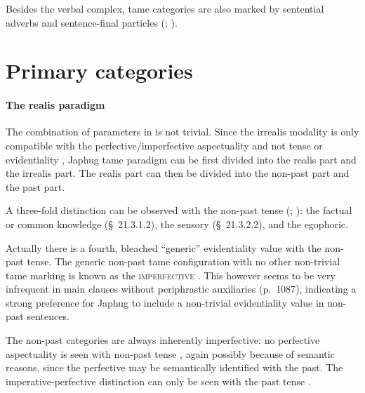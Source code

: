 \documentclass[a4paper, oneside, 12pt]{report}
\newcommand*{\citesec}[1]{\S~{#1}}
\newcommand*{\citetable}[1]{Table~{#1}}
\newcommand*{\citepage}[1]{p.~{#1}}
\newcommand*{\citepages}[1]{pp.~{#1}}
\newcommand{\category}[1]{\textsc{#1}}
\begin{document}
Besides the verbal complex, \acs{tame} categories are also marked by 
sentential adverbs and sentence-final particles 
(\citealt[\citepage{518}]{jacques2019egophoric}; \citealt[\citesec{21.8}]{jacques2021grammar}).


\section{Primary categories}
\label{sec:tame.primay}

\paragraph*{The realis paradigm}
The combination of parameters in  is not trivial.
Since the irrealis modality is only compatible with the perfective/imperfective aspectuality
and not tense or evidentiality
\citep[\citepage{1119}]{jacques2021grammar},
Japhug \ac{tame} paradigm can be first divided into the realis part and the irrealis part.
The realis part can then be divided into the non-past part and the past part.

A three-fold distinction can be observed with the non-past tense
(\citealt[\citesec{21.3.4}]{jacques2021grammar}; 
\citealt[\citepage{517}]{jacques2019egophoric}): 
the factual or common knowledge (\citesec{21.3.1.2}), 
the sensory (\citesec{21.3.2.2}),
and the egophoric.

Actually there is a fourth, bleached ``generic'' evidentiality value 
with the non-past tense.
The generic non-past \acs{tame} configuration 
with no other non-trivial \acs{tame} marking 
is known as the \category{imperfective} \citep[\citesec{21.2}]{jacques2021grammar}.
This however seems to be very infrequent in main clauses
without periphrastic auxiliaries (\citepage{1087}),
indicating a strong preference for Japhug 
to include a non-trivial evidentiality value in non-past sentences.

The non-past categories are always inherently imperfective:
no perfective aspectuality is seen with non-past tense 
\citep[\citepage{517}]{jacques2019egophoric},
again possibly because of semantic reasons,
since the perfective may be semantically identified with the past.
The imperative-perfective distinction can only be seen 
with the past tense \citep[\citetable{21.1}, note that the \category{aorist} is also known as 
the \category{past perfective}; \citepages{1135, 1143}]{jacques2021grammar}.
\end{document}
